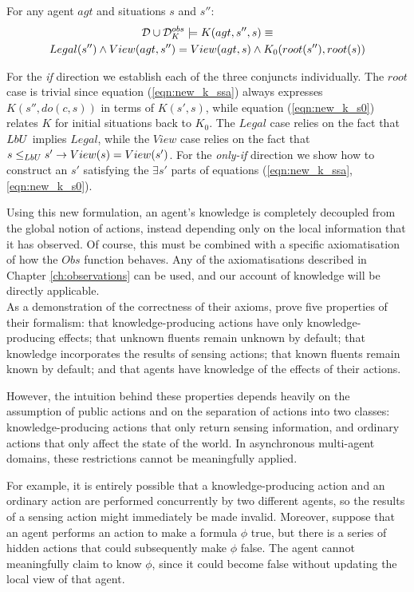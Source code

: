 \begin{thm}
\label{thm:k_obs_equiv} For any agent $agt$ and situations $s$
and $s''$:\begin{multline*}
\mathcal{D}\cup\mathcal{D}_{K}^{obs}\models K(agt,s'',s)\equiv\\
Legal(s'')\wedge View(agt,s'')=View(agt,s)\wedge K_{0}(root(s''),root(s))\end{multline*}

\end{thm}
\begin{proofsketch}
For the \emph{if} direction we establish each of the three conjuncts
individually. The $root$ case is trivial since equation (\ref{eqn:new_k_ssa})
always expresses $K(s'',do(c,s))$ in terms of $K(s',s)$, while equation
(\ref{eqn:new_k_s0}) relates $K$ for initial situations back to
$K_{0}$. The $Legal$ case relies on the fact that $LbU$ implies
$Legal$, while the $View$ case relies on the fact that $s\leq_{LbU}s'\rightarrow View(s)=View(s')$.
For the \emph{only-if} direction we show how to construct an $s'$
satisfying the $\exists s'$ parts of equations (\ref{eqn:new_k_ssa},\ref{eqn:new_k_s0}). 
\end{proofsketch}
Using this new formulation, an agent's knowledge is completely decoupled
from the global notion of actions, instead depending only on the local
information that it has observed. Of course, this must be combined
with a specific axiomatisation of how the $Obs$ function behaves.
Any of the axiomatisations described in Chapter \ref{ch:observations}
can be used, and our account of knowledge will be directly applicable.\\


As a demonstration of the correctness of their axioms, \citet{scherl03sc_knowledge}
prove five properties of their formalism: that knowledge-producing
actions have only knowledge-producing effects; that unknown fluents
remain unknown by default; that knowledge incorporates the results
of sensing actions; that known fluents remain known by default; and
that agents have knowledge of the effects of their actions.

However, the intuition behind these properties depends heavily on
the assumption of public actions and on the separation of actions
into two classes: knowledge-producing actions that only return sensing
information, and ordinary actions that only affect the state of the
world. In asynchronous multi-agent domains, these restrictions cannot
be meaningfully applied.

For example, it is entirely possible that a knowledge-producing action
and an ordinary action are performed concurrently by two different
agents, so the results of a sensing action might immediately be made
invalid. Moreover, suppose that an agent performs an action to make
a formula $\phi$ true, but there is a series of hidden actions that
could subsequently make $\phi$ false. The agent cannot meaningfully
claim to know $\phi$, since it could become false without updating
the local view of that agent.

